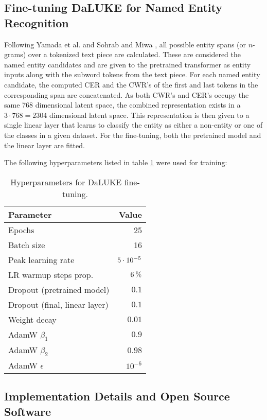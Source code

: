 \documentclass[main.tex]{subfiles}
\begin{document}
\subsection{Fine-tuning DaLUKE for Named Entity Recognition}%
\label{sub:finetune-ner}
Following Yamada et al. \cite{yamada2020luke} and Sohrab and Miwa \cite{sohrab2018nestedner}, all possible entity spans (or $n$-grams) over a tokenized text piece are calculated.
These are considered the named entity candidates and are given to the pretrained transformer as entity inputs along with the subword tokens from the text piece.
For each named entity candidate, the computed CER and the CWR's of the first and last tokens in the corresponding span are concatenated.
As both CWR's and CER's occupy the same 768 dimensional latent space, the combined representation exists in a $ 3\cdot 768 = 2304 $ dimensional latent space.
This representation is then given to a single linear layer that learns to classify the entity as either a non-entity or one of the classes in a given dataset.
For the fine-tuning, both the pretrained model and the linear layer are fitted.

The following hyperparameters listed in table \ref{tab:finetune-hyper} were used for training:
\begin{table}[H]
    \centering
    \begin{tabular}{l|r}
        Parameter  &    Value\\\hline
        Epochs     & 25\\
        Batch size &    16\\
        Peak learning rate & $5\cdot10^{-5}$\\
        LR warmup steps prop. & $ 6\:\text{\%{}} $\\
        Dropout (pretrained model) & $ 0.1 $\\
        Dropout (final, linear layer) & $ 0.1 $\\
        Weight decay & $ 0.01 $\\
        AdamW $ \beta_1 $ & $ 0.9 $\\
        AdamW $ \beta_2 $ & $ 0.98 $\\
        AdamW $ \epsilon $ & $ 10^{-6} $
    \end{tabular}
    \caption{Hyperparameters for DaLUKE fine-tuning.}\label{tab:finetune-hyper}
\end{table}\noindent

\subsection{Implementation Details and Open Source Software}%
\label{sub:oss}
\end{document}
